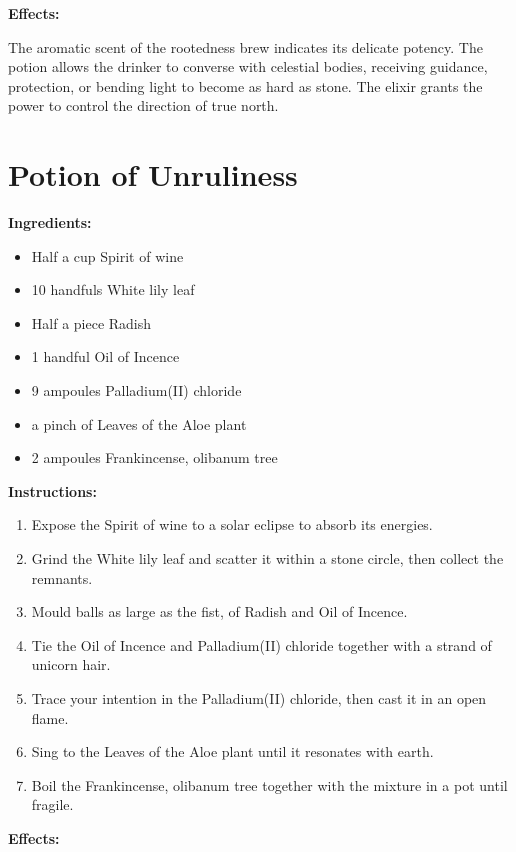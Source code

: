 \documentclass{article}
\begin{document}
\textbf{Effects:}

The aromatic scent of the rootedness brew indicates its delicate potency. The potion allows the drinker to converse with celestial bodies, receiving guidance, protection, or bending light to become as hard as stone. The elixir grants the power to control the direction of true north.

\newpage
\section*{Potion of Unruliness}

\textbf{Ingredients:}

\begin{itemize}
  \item Half a cup Spirit of wine
  \item 10 handfuls White lily leaf
  \item Half a piece Radish
  \item 1 handful Oil of Incence
  \item 9 ampoules Palladium(II) chloride
  \item a pinch of Leaves of the Aloe plant
  \item 2 ampoules Frankincense, olibanum tree
\end{itemize}

\textbf{Instructions:}

\begin{enumerate}
  \item Expose the Spirit of wine to a solar eclipse to absorb its energies.
  \item Grind the White lily leaf and scatter it within a stone circle, then collect the remnants.
  \item Mould balls as large as the fist, of Radish and Oil of Incence.
  \item Tie the Oil of Incence and Palladium(II) chloride together with a strand of unicorn hair.
  \item Trace your intention in the Palladium(II) chloride, then cast it in an open flame.
  \item Sing to the Leaves of the Aloe plant until it resonates with earth.
  \item Boil the Frankincense, olibanum tree together with the mixture in a pot until fragile.
\end{enumerate}

\textbf{Effects:}
\end{document}
